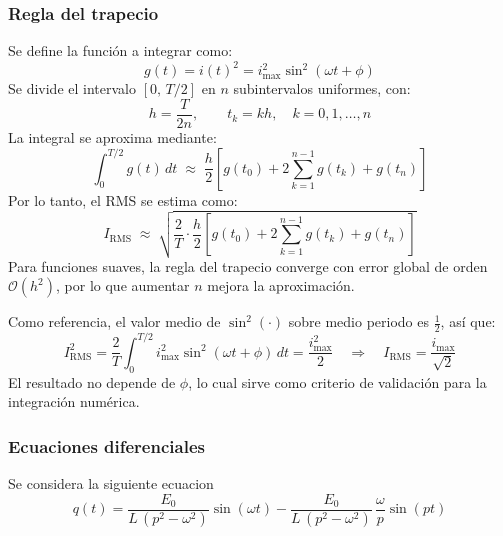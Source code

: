 \documentclass[pdflatex,sn-mathphys-num]{sn-jnl}%
\begin{document}
\subsubsection{Regla del trapecio}
Se define la función a integrar como:
\begin{equation}
g(t)=i(t)^{2}=i_{\max}^{2}\sin^{2}(\omega t+\phi)
\end{equation}
Se divide el intervalo $[0,\,T/2]$ en $n$ subintervalos uniformes, con:
\begin{equation}
h=\frac{T}{2n},\qquad t_k=kh,\quad k=0,1,\dots,n
\end{equation}
La integral se aproxima mediante:
\begin{equation}
\int_{0}^{T/2} g(t)\,dt\;\approx\;\frac{h}{2}\left[g(t_0)+2\sum_{k=1}^{n-1} g(t_k)+g(t_n)\right]
\end{equation}
Por lo tanto, el RMS se estima como:
\begin{equation}
I_{\mathrm{RMS}}\;\approx\;\sqrt{\frac{2}{T}\cdot\frac{h}{2}\left[g(t_0)+2\sum_{k=1}^{n-1} g(t_k)+g(t_n)\right]}
\end{equation}
Para funciones suaves, la regla del trapecio converge con error global de orden $\mathcal{O}(h^2)$, por lo que aumentar $n$ mejora la aproximación.

Como referencia, el valor medio de $\sin^2(\cdot)$ sobre medio periodo es $\tfrac{1}{2}$, así que:
\begin{equation}
I_{\mathrm{RMS}}^{2}=\frac{2}{T}\int_{0}^{T/2} i_{\max}^{2}\sin^{2}(\omega t+\phi)\,dt=\frac{i_{\max}^{2}}{2}
\quad\Rightarrow\quad
I_{\mathrm{RMS}}=\frac{i_{\max}}{\sqrt{2}}
\end{equation}
El resultado no depende de $\phi$, lo cual sirve como criterio de validación para la integración numérica.


\subsubsection{Ecuaciones diferenciales}
Se considera la siguiente ecuacion
$$
q(t)=\frac{E_0}{L\,(p^2-\omega^2)}\sin(\omega t)-\frac{E_0}{L\,(p^2-\omega^2)}\,\frac{\omega}{p}\sin(pt)
$$
\end{document}
